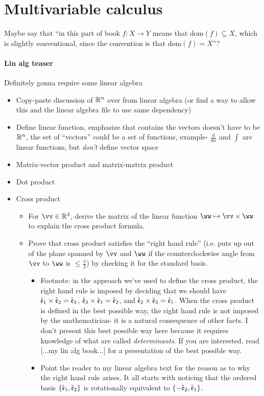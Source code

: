 \part*{Multivariable calculus}

Maybe say that ``in this part of book $f:X \rightarrow Y$ means that $\text{dom}(f) \subseteq X$, which is slightly conventional, since the convention is that $\text{dom}(f) = X$''?

\subsection*{Lin alg teaser}

Definitely gonna require some linear algebra

\begin{itemize}
    \item Copy-paste discussion of $\mathbb{R}^n$ over from linear algebra (or find a way to allow this and the linear algebra file to use same dependency)
    \item Define linear function, emphasize that contains the vectors doesn't have to be $\mathbb{R}^n$, the set of ``vectors'' could be a set of functions, example- $\frac{d}{dx}$ and $\int$ are linear functions, but \textit{don't} define vector space
    \item Matrix-vector product and matrix-matrix product
    \item Dot product
    \item Cross product
    \begin{itemize}
        \item For $\vv \in \R^3$, derive the matrix of the linear function $\ww \mapsto \vv \times \ww$ to explain the cross product formula.
        \item Prove that cross product satisfies the ``right hand rule'' (i.e. puts up out of the plane spanned by $\vv$ and $\ww$ if the counterclockwise angle from $\vv$ to $\ww$ is $\leq \frac{\pi}{2}$) by checking it for the standard basis.
        \begin{itemize}
            \item Footnote: in the approach we've used to define the cross product, the right hand rule is imposed by deciding that we should have $\hat{\mathfrak{e}}_1 \times \hat{\mathfrak{e}}_2 = \hat{\mathfrak{e}}_3$, $\hat{\mathfrak{e}}_3 \times \hat{\mathfrak{e}}_1 = \hat{\mathfrak{e}}_2$, and $\hat{\mathfrak{e}}_2 \times \hat{\mathfrak{e}}_3 = \hat{\mathfrak{e}}_1$. When the cross product is defined in the best possible way, the right hand rule is not imposed by the mathematician- it is a natural consequence of other facts. I don't present this best possible way here because it requires knowledge of what are called \textit{determinants}. If you are interested, read [...my lin alg book...] for a presentation of the best possible way.
            \item Point the reader to my linear algebra text for the reason as to why the right hand rule arises. It all starts with noticing that the ordered basis $\{\hat{\mathfrak{e}}_1, \hat{\mathfrak{e}}_2\}$ is rotationally equivalent to $\{-\hat{\mathfrak{e}}_2, \hat{\mathfrak{e}}_1\}$.
        \end{itemize}
    \end{itemize}
\end{itemize}


